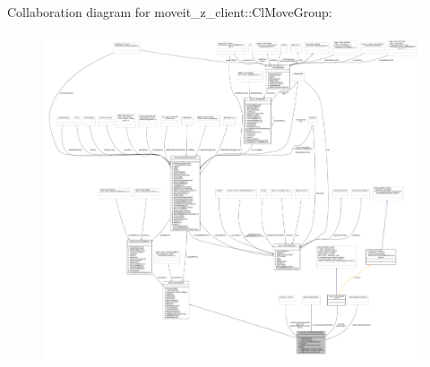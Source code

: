 Collaboration diagram for moveit\+\_\+z\+\_\+client\+:\+:Cl\+Move\+Group\+:
\nopagebreak
\begin{figure}[H]
\begin{center}
\leavevmode
\includegraphics[width=350pt]{classmoveit__z__client_1_1ClMoveGroup__coll__graph}
\end{center}
\end{figure}
